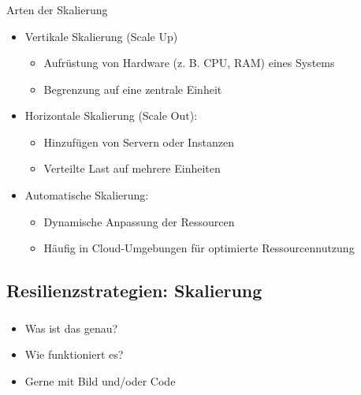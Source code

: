 \begin{frame}
    \frametitle{\insertsection}
    \framesubtitle{\insertsubsection}

    \begin{block}{Arten der Skalierung}
        \begin{itemize}
            \item Vertikale Skalierung (Scale Up)
            \begin{itemize}
                \item Aufrüstung von Hardware (z. B. CPU, RAM) eines Systems
                \item Begrenzung auf eine zentrale Einheit
            \end{itemize}
            \item Horizontale Skalierung (Scale Out):
            \begin{itemize}
                \item Hinzufügen von Servern oder Instanzen
                \item Verteilte Last auf mehrere Einheiten
            \end{itemize}
            \item Automatische Skalierung:
            \begin{itemize}
                \item Dynamische Anpassung der Ressourcen
                \item Häufig in Cloud-Umgebungen für optimierte Ressourcennutzung
            \end{itemize}
        \end{itemize}
    \end{block}
\end{frame}


\subsection{Resilienzstrategien: Skalierung}
\begin{frame}
    \frametitle{\insertsection}
    \framesubtitle{\insertsubsection}

    \begin{itemize}
        \item Was ist das genau?
        \item Wie funktioniert es?
        \item Gerne mit Bild und/oder Code %
    \end{itemize}
\end{frame}


